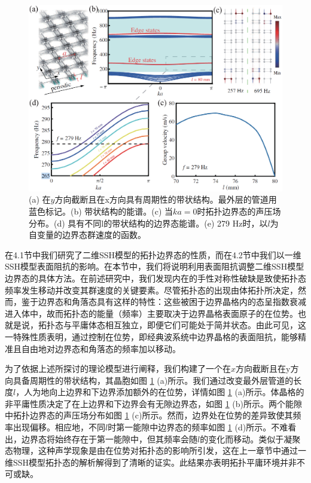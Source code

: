 \begin{figure}[h!]
    \centering
    \includegraphics[width=1\textwidth]{images/fig4-6.eps} 
    \caption{(a) 在$y$方向截断且在x方向具有周期性的带状结构。最外层的管道用蓝色标记。(b) 带状结构的能谱。(c) 当$ka = 0$时拓扑边界态的声压场分布。(d) 具有不同l的带状结构的边界态能谱。(e) 279 Hz时，以$l$为自变量的边界态群速度的函数。}
    \label{fig_4_6}
\end{figure} 

在4.1节中我们研究了二维SSH模型的拓扑边界态的性质，而在4.2节中我们以一维SSH模型表面阻抗的影响。在本节中，我们将说明利用表面阻抗调整二维SSH模型边界态的具体方法。在前述研究中，我们发现内在的手性对称性破缺是致使拓扑态频率发生移动并改变其群速度的关键要素。尽管拓扑态的出现由体拓扑所决定，然而，鉴于边界态和角落态具有这样的特性：这些被困于边界晶格内的态呈指数衰减进入体中，故而拓扑态的能量（频率）主要取决于边界晶格表面原子的在位势。也就是说，拓扑态与平庸体态相互独立，即便它们可能处于简并状态。由此可见，这一特殊性质表明，通过控制在位势，即经典波系统中边界晶格的表面阻抗，能够精准且自由地对边界态和角落态的频率加以移动。

为了依据上述所探讨的理论模型进行阐释，我们构建了一个在$x$方向截断且在y方向具备周期性的带状结构，其晶胞如图 \ref{fig_4_6} (a)所示。我们通过改变最外层管道的长度$l$，人为地向上边界和下边界添加额外的在位势，详情如图 \ref{fig_4_6} (a)所示。体晶格的非平庸性质决定了在上边界和下边界会有无隙边界态，如图 \ref {fig_4_6} (b)所示。两个能隙中拓扑边界态的声压场分布如图 \ref{fig_4_6} (c)所示。然而，边界处在位势的差异致使其频率出现偏移。相应地，不同$l$时第一能隙中边界态的频率如图 \ref{fig_4_6} (d)所示。不难看出，边界态将始终存在于第一能隙中，但其频率会随$l$的变化而移动。类似于凝聚态物理，这种声学现象是由在位势对拓扑态的影响所引发，这在上一章节中通过一维SSH模型拓扑态的解析解得到了清晰的证实。此结果亦表明拓扑平庸环境并非不可或缺。

